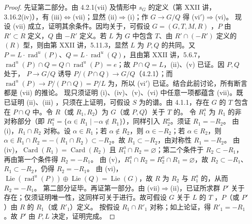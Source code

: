 \begin{proof}
先证第二部分。由 4.2.1(vii) 及情形中 $s_G$ 的定义（第 XXII 讲，3.16.2(iv)），有 (iii)$\Leftrightarrow$(vii)；显然 (ii)$\Rightarrow$(i)；作 $G\to G/Q$ 得 (vi$'$)$\Rightarrow$(vi)。
现设 (vii) 成立，证明其余条件。因均关于，可假设 $G=(G,T,M,R)$ ，$P$ 由 $R'\subset R$ 定义，$Q$ 由 $-R'$ 定义。若 $L$ 为 $G$ 中包含 $T$、由 $R'\cap(-R')$ 定义的 $(R)$ 型，则由第 XXII 讲，5.11.3，显然 $L$ 为 $P,Q$ 的共同。又 $P=L\cdot\operatorname{rad}^{u}(P)$、$Q=L\cdot\operatorname{rad}^{u}(Q)$，且由第 XXII 讲，5.6.7，$\operatorname{rad}^{u}(P)\cap Q=Q\cap\operatorname{rad}^{u}(P)=e$；故 $P\cap Q=L$，(ii)、(v) 已证。因 $P,Q$ 处于， $P\to G/Q$ 诱导 $P/(P\cap Q)\to G/Q$（4.2.1）；而 $\operatorname{rad}^{u}(P)\to P/(P\cap Q)=P/L$ 为，所以 (vi$'$) 已证。结合此前讨论，所有断言都是 (vii) 的推论。
现只须证明 (i)、(iv)、(v)、(vi) 中任意一项都蕴含 (vii)。既已证明 (ii)、(iii) ，只须在上证明，可假设 $S$ 为的谱。由 4.1.1，存在 $G$ 的 $T$ 包含在 $P\cap Q$ 中。令 $R$（或 $R_1,R_2$）为 $G$（或 $P,Q$）关于 $T$ 的。
令 $R_1^a$ 为 $R_1$ 的非对称部分（即 $R_1^a=\{\alpha\in R_1\mid-\alpha\notin R_1\}$），同样引入 $R_2^a$。须证 $R_1=-R_2$。
由 (i)，$R_1\cap R_2$ 对称。设 $\alpha\in R_1$；若 $\alpha\notin R_2$，则 $\alpha\in-R_2$；若 $\alpha\in R_2$，则 $\alpha\in R_1\cap R_2=-(R_1\cap R_2)\subset-R_2$。故 $R_1\subset-R_2$，由对称性 $R_1=-R_2$。
由 (iv)，$\operatorname{Card}(R_1)=\operatorname{Card}(R_2)$ 且 $R_1^a\cap R_2=\varnothing$；第二个条件于 $R_2\subset-R_1$，再由第一个条件得 $R_2=-R_1$。
由 (v)，$R_1^a\cap R_2=R_2^a\cap R_1=\varnothing$，故 $R_2\subset-R_1$、$R_1\subset-R_2$，仍得 $R_2=-R_1$。
由 (vi)，$\operatorname{Lie}(\operatorname{rad}^{u}(P))\oplus\operatorname{Lie}(Q)=\operatorname{Lie}(G)$，故 $R$ 为 $R_2$ 与 $R_1^a$ 的，从而 $R_2=-R_1$。
第二部分证毕。再证第一部分。由 (vii)$\Rightarrow$(ii)，已证所求群 $P'$ 关于存在；仅须证明唯一性，这同样可关于进行。故可假设 $G$ 关于 $L$ 的 $T$ ，$P$（或 $P'$）由 $R$ 的 $R_1$（或 $R'_1$）定义。
按假设 $R_1\cap R'_1$ 对称；如上论证，得 $R'_1=-R_1$。故 $P'$ 由 $P,L$ 决定，证明完成。
\end{proof}
